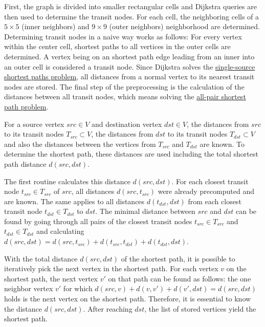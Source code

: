 			First, the graph is divided into smaller rectangular cells and Dijkstra queries are then used to determine the transit nodes.
			For each cell, the neighboring cells of a $5 \times 5$ (inner neighbors) and $9 \times 9$ (outer neighbors) neighborhood are determined.
			Determining transit nodes in a naive way works as follows:
			For every vertex within the center cell, shortest paths to all vertices in the outer cells are determined.
			A vertex being on an shortest path edge leading from an inner into an outer cell is considered a transit node.
			Since Dijkstra solves the \hyperref[subsubsec:single-source-shortest-path]{single-source shortest paths problem}, all distances from a normal vertex to its nearest transit nodes are stored.
			The final step of the preprocessing is the calculation of the distances between all transit nodes, which means solving the \hyperref[subsubsec:all-pair-shortest-path]{all-pair shortest path problem}.
			
			For a source vertex $src \in V$ and destination vertex $dst \in V$, the distances from $src$ to its transit nodes $T_{src} \subset V$, the distances from $dst$ to its transit nodes $T_{dst} \subset V$ and also the distances between the vertices from $T_{src}$ and $T_{dst}$ are known.
			To determine the shortest path, these distances are used including the total shortest path distance $d(src, dst)$.
			
			The first routine calculates this distance $d(src, dst)$.
			For each closest transit node $t_{src} \in T_{src}$ of $src$, all distances $d(src, t_{src})$ were already precomputed and are known.
			The same applies to all distances $d(t_{dst}, dst)$ from each closest transit node $t_{dst} \in T_{dst}$ to $dst$.
			The minimal distance between $src$ and $dst$ can be found by going through all pairs of the closest transit nodes $t_{src} \in T_{src}$ and $t_{dst} \in T_{dst}$ and calculating $d(src, dst) = d(src, t_{src}) + d(t_{src}, t_{dst}) + d(t_{dst}, dst)$.
			
			With the total distance $d(src, dst)$ of the shortest path, it is possible to iteratively pick the next vertex in the shortest path.
			For each vertex $v$ on the shortest path, the next vertex $v'$ on that path can be found as follows:
			the one neighbor vertex $v'$ for which $d(src, v) + d(v, v') + d(v', dst) = d(src, dst)$ holds is the next vertex on the shortest path.
			Therefore, it is essential to know the distance $d(src, dst)$.
			After reaching $dst$, the list of stored vertices yield the shortest path.
		
